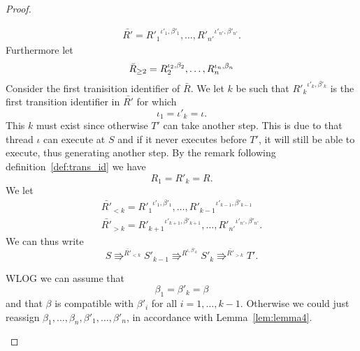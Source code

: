 \begin{proof}
\begin{description}
\begin{equation*}
\begin{gathered}
          \bar{R'} = {R'_1}^{\iota'_1, \beta'_1}, \dots, {R'_{n'}}^{\iota'_{n'},
          \beta'_{n'}}.
        \end{gathered}
      \end{equation*}
      Furthermore let
      \begin{equation*}
        \bar{R}_{\geq 2} = R_2^{\iota_2, \beta_2}, \dots, R_n^{\iota_n, \beta_n} \\
      \end{equation*}
      Consider the first tranisition identifier of $\bar{R}$. We let
      $k$ be such
      that ${R'_k}^{\iota'_k, \beta'_k}$ is the first transition identifier in
      $\bar{R'}$ for which 
      \begin{equation} \label{eq:qd1}
        \iota_1 = \iota'_k = \iota.
      \end{equation} 
      This $k$ must exist since otherwise $T'$ can take another step. This is
      due to that thread $\iota$ can execute at $S$ and if it never executes
      before $T'$, it will still be able to execute, thus generating another
      step.  By the remark following definition~\ref{def:trans_id} we have 
      \begin{equation} \label{eq:qd2}
        R_1 = R'_k = R.
      \end{equation} 
      We let
      \begin{equation*}
        \begin{gathered}
          \bar{R'}_{<k} = {R'_1}^{\iota'_1, \beta'_1}, \dots,
          {R'_{k-1}}^{\iota'_{k-1}, \beta'_{k-1}}  \\
          \bar{R'}_{>k} = {R'_{k+1}}^{\iota'_{k+1}, \beta'_{k+1}}, \dots,
          {R'_{n'}}^{\iota'_{n'}, \beta'_{n'}}.
        \end{gathered}
      \end{equation*}
      We can thus write
      \begin{equation} \label{eq:qd4}
        S \Rrightarrow^{\bar{R'}_{<k}} S'_{k-1} \Rrightarrow^{R^{\iota,
        \beta'_k}} S'_k \Rrightarrow^{\bar{R'}_{>k}} T'.
      \end{equation}

      WLOG we can assume that
      \begin{equation} \label{eq:qd3}
        \beta_1 = \beta'_k = \beta
      \end{equation}
      and that $\beta$ is compatible with $\beta'_i$ for all $i = 1, \dots,
      k-1$.  Otherwise we could just reassign $\beta_1, \dots, \beta_n,
      \beta'_1, \dots, \beta'_n$, in accordance with Lemma~\ref{lem:lemma4}.


\end{description}
\end{proof}

